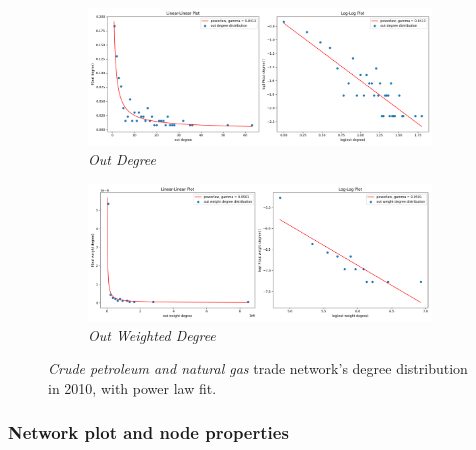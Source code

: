 \begin{figure}
    \centering
    \begin{subfigure}{\textwidth}
        \centering
        \includegraphics[width=\textwidth]{pics/powerlaw_out_degree_p06_y2010.png}
        \caption{\textit{Out Degree}}
        \label{fig:plgas}
    \end{subfigure}
    
    \begin{subfigure}{\textwidth}
        \centering
        \includegraphics[width=\textwidth]{pics/powerlaw_out_weight_degree_p06_y2010.png}
        \caption{\textit{Out Weighted Degree}}
        \label{fig:plgasw}
    \end{subfigure}
    \caption{\textit{Crude petroleum and natural gas} trade network's degree distribution in 2010, with power law fit.}
    \label{fig:gasdistrib}
\end{figure}


\subsubsection*{Network plot and node properties}

